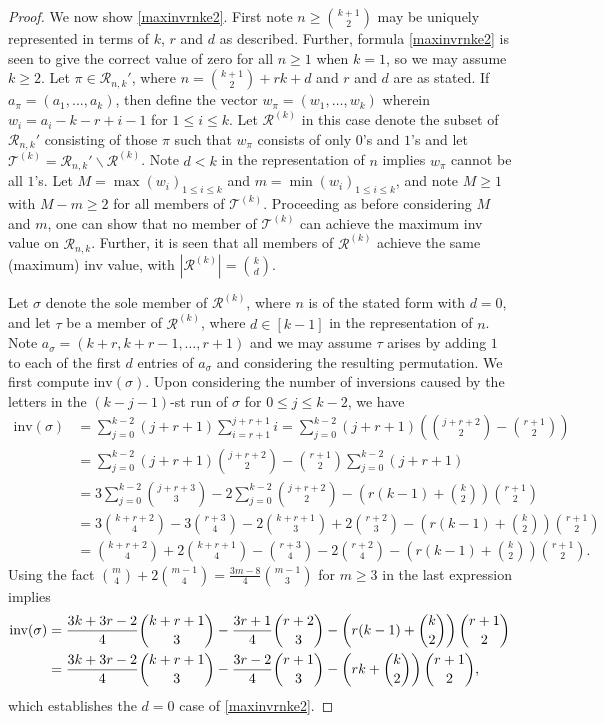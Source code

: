 \documentclass[10pt,a4paper]{amsart}
\theoremstyle{plain}
\begin{document}
\begin{proof}
We now show \eqref{maxinvrnke2}. First note $n \geq \binom{k+1}{2}$ may be uniquely represented in terms of $k$, $r$ and $d$ as described.  Further, formula \eqref{maxinvrnke2} is seen to give the correct value of zero for all $n \geq 1$ when $k=1$, so we may assume $k \geq 2$.  Let $\pi \in \mathcal{R}_{n,k}'$, where $n=\binom{k+1}{2}+rk+d$ and $r$ and $d$ are as stated.  If $a_\pi=(a_1,\ldots,a_k)$, then define the vector $w_\pi=(w_1,\ldots,w_k)$ wherein $w_i=a_i-k-r+i-1$ for $1 \leq i \leq k$. Let $\mathcal{R}^{(k)}$ in this case denote the subset of $\mathcal{R}_{n,k}'$ consisting of those $\pi$ such that $w_\pi$ consists of only $0$'s and $1$'s and let $\mathcal{T}^{(k)}=\mathcal{R}_{n,k}'\backslash \mathcal{R}^{(k)}$.  Note $d<k$ in the representation of $n$ implies $w_\pi$ cannot be all $1$'s. Let $M=\max(w_i)_{1 \leq i \leq k}$ and $m=\min(w_i)_{1 \leq i \leq k}$, and note $M \geq 1$ with $M -m \geq 2$ for all members of $\mathcal{T}^{(k)}$.  Proceeding as before considering $M$ and $m$, one can show that no member of $\mathcal{T}^{(k)}$ can achieve the maximum inv value on $\mathcal{R}_{n,k}$.  Further, it is seen that all members of $\mathcal{R}^{(k)}$ achieve the same (maximum) inv value, with $|\mathcal{R}^{(k)}|=\binom{k}{d}$.

Let $\sigma$ denote the sole member of $\mathcal{R}^{(k)}$, where $n$ is of the stated form with $d=0$, and let $\tau$ be a member of $\mathcal{R}^{(k)}$, where $d \in [k-1]$ in the representation of $n$.  Note $a_\sigma=(k+r,k+r-1,\ldots,r+1)$ and we may assume $\tau$ arises by adding $1$ to each of the first $d$ entries of $a_\sigma$ and considering the resulting permutation.  We first compute $\text{inv}(\sigma)$.  Upon considering the number of inversions caused by the letters in the $(k-j-1)$-st run of $\sigma$ for $0 \leq j \leq k-2$, we have
\begin{align*}
\text{inv}(\sigma)&=\sum_{j=0}^{k-2}(j+r+1)\sum_{i=r+1}^{j+r+1}i=\sum_{j=0}^{k-2}(j+r+1)\left(\binom{j+r+2}{2}-\binom{r+1}{2}\right)\\
&=\sum_{j=0}^{k-2}(j+r+1)\binom{j+r+2}{2}-\binom{r+1}{2}\sum_{j=0}^{k-2}(j+r+1)\\
&=3\sum_{j=0}^{k-2}\binom{j+r+3}{3}-2\sum_{j=0}^{k-2}\binom{j+r+2}{2}-\left(r(k-1)+\binom{k}{2}\right)\binom{r+1}{2}\\
&=3\binom{k+r+2}{4}-3\binom{r+3}{4}-2\binom{k+r+1}{3}+2\binom{r+2}{3}-\left(r(k-1)+\binom{k}{2}\right)\binom{r+1}{2}\\
&=\binom{k+r+2}{4}+2\binom{k+r+1}{4}-\binom{r+3}{4}-2\binom{r+2}{4}-\left(r(k-1)+\binom{k}{2}\right)\binom{r+1}{2}.
\end{align*}
Using the fact $\binom{m}{4}+2\binom{m-1}{4}=\frac{3m-8}{4}\binom{m-1}{3}$ for $m \geq 3$ in the last expression implies
\begin{align}
\text{inv}(\sigma)&=\frac{3k+3r-2}{4}\binom{k+r+1}{3}-\frac{3r+1}{4}\binom{r+2}{3}-\left(r(k-1)+\binom{k}{2}\right)\binom{r+1}{2}\notag\\
&=\frac{3k+3r-2}{4}\binom{k+r+1}{3}-\frac{3r-2}{4}\binom{r+1}{3}-\left(rk+\binom{k}{2}\right)\binom{r+1}{2},\label{d=0case(b)}
\end{align}
which establishes the $d=0$ case of \eqref{maxinvrnke2}.


\end{proof}
\end{document}
